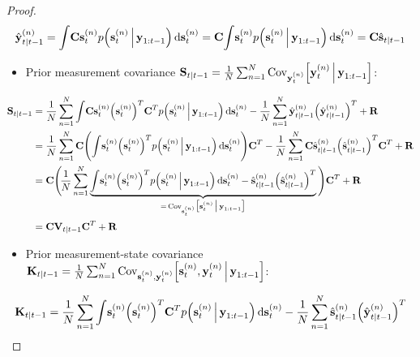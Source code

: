 \begin{proof}
\begin{align*}
				\hat{\boldsymbol{\mathrm{y}}}_{t \vert t - 1}^{(n)}
					= \int\! \boldsymbol{\mathrm{C}} \boldsymbol{\mathrm{s}}_t^{(n)} p\Big(\boldsymbol{\mathrm{s}}_t^{(n)} \,\Big\vert\, \boldsymbol{\mathrm{y}}_{1:t - 1}\Big) \dd{\boldsymbol{\mathrm{s}}_t^{(n)}}
					= \boldsymbol{\mathrm{C}} \! \int\! \boldsymbol{\mathrm{s}}_t^{(n)} p\Big(\boldsymbol{\mathrm{s}}_t^{(n)} \,\Big\vert\, \boldsymbol{\mathrm{y}}_{1:t - 1}\Big) \dd{\boldsymbol{\mathrm{s}}_t^{(n)}}
					= \boldsymbol{\mathrm{C}} \hat{\boldsymbol{\mathrm{s}}}_{t \vert t - 1}
			\end{align*}
			\begin{itemize}
				\item Prior measurement covariance \( \boldsymbol{\mathrm{S}}_{t \vert t - 1} = \frac{1}{N} \sum_{n = 1}^{N} \operatorname{Cov}_{\boldsymbol{\mathrm{y}}_t^{(n)}}\!\Big[\boldsymbol{\mathrm{y}}_t^{(n)} \,\Big\vert\, \boldsymbol{\mathrm{y}}_{1:t - 1}\Big] \):
			\end{itemize}
			\begin{align*}
				\boldsymbol{\mathrm{S}}_{t \vert t - 1}
					&= \frac{1}{N} \sum_{n = 1}^{N} \int\! \boldsymbol{\mathrm{C}} \boldsymbol{\mathrm{s}}_t^{(n)} \Big(\boldsymbol{\mathrm{s}}_t^{(n)}\Big)^T \boldsymbol{\mathrm{C}}^T p\Big(\boldsymbol{\mathrm{s}}_t^{(n)} \,\Big\vert\, \boldsymbol{\mathrm{y}}_{1:t - 1}\Big) \dd{\boldsymbol{\mathrm{s}}_t^{(n)}} - \frac{1}{N} \sum_{n = 1}^{N} \hat{\boldsymbol{\mathrm{y}}}_{t \vert t - 1}^{(n)} \Big( \hat{\boldsymbol{\mathrm{y}}}_{t \vert t - 1}^{(n)} \Big)^T + \boldsymbol{\mathrm{R}} \\
					&= \frac{1}{N} \sum_{n = 1}^{N} \boldsymbol{\mathrm{C}} \Bigg(\! \int\! \boldsymbol{\mathrm{s}}_t^{(n)} \Big(\boldsymbol{\mathrm{s}}_t^{(n)}\Big)^T p\Big(\boldsymbol{\mathrm{s}}_t^{(n)} \,\Big\vert\, \boldsymbol{\mathrm{y}}_{1:t - 1}\Big) \dd{\boldsymbol{\mathrm{s}}_t^{(n)}} \!\Bigg) \boldsymbol{\mathrm{C}}^T - \frac{1}{N} \sum_{n = 1}^{N} \boldsymbol{\mathrm{C}} \hat{\boldsymbol{\mathrm{s}}}_{t \vert t - 1}^{(n)} \Big( \hat{\boldsymbol{\mathrm{s}}}_{t \vert t - 1}^{(n)} \Big)^T \boldsymbol{\mathrm{C}}^T + \boldsymbol{\mathrm{R}} \\
					&= \boldsymbol{\mathrm{C}} \Bigg(\! \frac{1}{N} \sum_{n = 1}^{N} \underbrace{\int\! \boldsymbol{\mathrm{s}}_t^{(n)} \Big(\boldsymbol{\mathrm{s}}_t^{(n)}\Big)^T p\Big(\boldsymbol{\mathrm{s}}_t^{(n)} \,\Big\vert\, \boldsymbol{\mathrm{y}}_{1:t - 1}\Big) \dd{\boldsymbol{\mathrm{s}}_t^{(n)}} - \hat{\boldsymbol{\mathrm{s}}}_{t \vert t - 1}^{(n)} \Big( \hat{\boldsymbol{\mathrm{s}}}_{t \vert t - 1}^{(n)} \Big)^T}_{=\, \operatorname{Cov}_{\boldsymbol{\mathrm{s}}_t^{(n)}}\!\big[\boldsymbol{\mathrm{s}}_t^{(n)} \,\big\vert\, \boldsymbol{\mathrm{y}}_{1:t - 1}\big]} \Bigg) \boldsymbol{\mathrm{C}}^T + \boldsymbol{\mathrm{R}} \\
					&= \boldsymbol{\mathrm{C}} \boldsymbol{\mathrm{V}}_{t \vert t - 1} \boldsymbol{\mathrm{C}}^T + \boldsymbol{\mathrm{R}}
			\end{align*}
			\begin{itemize}
				\item Prior measurement-state covariance \( \boldsymbol{\mathrm{K}}_{t \vert t - 1} = \frac{1}{N} \sum_{n = 1}^{N} \operatorname{Cov}_{\boldsymbol{\mathrm{s}}_t^{(n)}, \boldsymbol{\mathrm{y}}_t^{(n)}}\!\Big[\boldsymbol{\mathrm{s}}_t^{(n)}, \boldsymbol{\mathrm{y}}_t^{(n)} \,\Big\vert\, \boldsymbol{\mathrm{y}}_{1:t - 1}\Big] \):
			\end{itemize}
			\begin{align*}
				\mat{K}_{t \subgiven t - 1}
					&= \frac{1}{N} \sum_{n = 1}^{N} \int\! \vec{s}_t^{(n)} \Big(\vec{s}_t^{(n)}\Big)^T \mat{C}^T p\Big(\vec{s}_t^{(n)} \Biggiven \vec{y}_{1:t - 1}\Big) \dd{\vec{s}_t^{(n)}} - \frac{1}{N} \sum_{n = 1}^{N} \hat{\vec{s}}_{t \subgiven t - 1}^{(n)} \Big(\hat{\vec{y}}_{t \subgiven t - 1}^{(n)}\Big)^T \\

\end{align*}
\end{proof}
